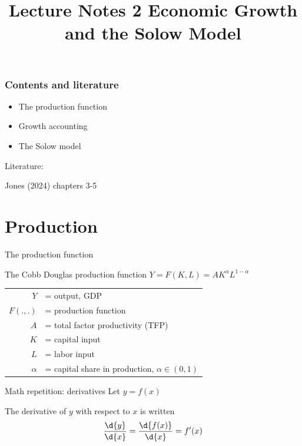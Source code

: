 \documentclass[10pt,handout]{beamer}
\title{Lecture Notes 2 \newline Economic Growth and the Solow Model}
\begin{document}
\maketitle


\begin{frame}
    \frametitle{Contents and literature}
    \begin{itemize}
        \item The production function
        \item Growth accounting
        \item The Solow model
    \end{itemize}\bigskip
    Literature: 
    \begin{tightitemize}
        \item Jones (2024) chapters 3-5
    \end{tightitemize}
\end{frame}


\section{Production}


\begin{frame}{The production function}
    \begin{block}{The Cobb Douglas production function}
        $Y = F(K,L) = A K^\alpha L^{1-\alpha}$
    \end{block} \bigskip
    
    \begin{table}
        \flushleft
        \begin{tabular}{rl}
            $Y$ & = output, GDP \\
            $F(.,.)$ & = production function \\
            $A$ & = total factor productivity (TFP)\\
            $K$ & = capital input \\
            $L$ & = labor input \\
            $\alpha$ & = capital share in production, $\alpha \in (0,1)$ \\
        \end{tabular}
    \end{table}
\end{frame}


\begin{frame}{Math repetition: derivatives}
Let $y=f(x)$ \par \medskip
The derivative of $y$ with respect to $x$ is written
\begin{equation*}
    \frac{\d{y}}{\d{x}}=\frac{\d{f(x)}}{\d{x}}=f'(x)
\end{equation*} \medskip
\end{frame}
\end{document}
